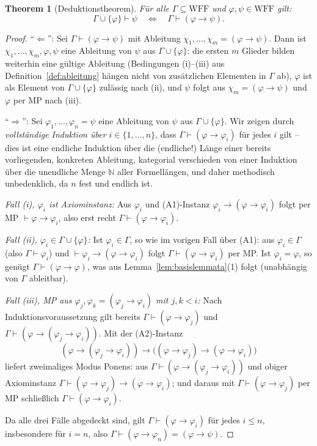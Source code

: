 \documentclass[12pt, a4paper]{article}
\newtheorem{theorem}{Theorem}[section]
\theoremstyle{definition}
\theoremstyle{remark}
\newcommand{\N}{\mathbb{N}}
\newcommand{\WFF}{\mathrm{WFF}}
\begin{document}
\begin{theorem}[Deduktionstheorem]
\label{thm:deduktionstheorem}
Für alle $\Gamma \subseteq \WFF$ und $\varphi,\psi \in \WFF$ gilt:
\[
  \Gamma \cup \{\varphi\} \vdash \psi \quad \Longleftrightarrow \quad \Gamma \vdash (\varphi \to \psi).
\]
\end{theorem}
\begin{proof}
``$\Leftarrow$'': Sei $\Gamma \vdash (\varphi\to\psi)$ mit Ableitung $\chi_1,\dots,\chi_m=(\varphi\to\psi)$. Dann ist $\chi_1,\dots,\chi_m,\varphi,\psi$ eine Ableitung von $\psi$ aus $\Gamma\cup\{\varphi\}$: die ersten $m$ Glieder bilden weiterhin eine gültige Ableitung (Bedingungen (i)--(iii) aus Definition~\ref{def:ableitung} hängen nicht von zusätzlichen Elementen in $\Gamma$ ab), $\varphi$ ist als Element von $\Gamma\cup\{\varphi\}$ zulässig nach (ii), und $\psi$ folgt aus $\chi_m = (\varphi\to\psi)$ und $\varphi$ per MP nach (iii).

``$\Rightarrow$'': Sei $\varphi_1,\dots,\varphi_n=\psi$ eine Ableitung von $\psi$ aus $\Gamma\cup\{\varphi\}$. Wir zeigen durch \emph{vollständige Induktion über $i \in \{1,\dots,n\}$}, dass $\Gamma \vdash (\varphi \to \varphi_i)$ für jedes $i$ gilt -- dies ist eine endliche Induktion über die (endliche!) Länge einer bereits vorliegenden, konkreten Ableitung, kategorial verschieden von einer Induktion über die unendliche Menge $\N$ aller Formellängen, und daher methodisch unbedenklich, da $n$ fest und endlich ist.

\emph{Fall (i), $\varphi_i$ ist Axiominstanz:} Aus $\varphi_i$ und (A1)-Instanz $\varphi_i \to (\varphi\to\varphi_i)$ folgt per MP $\vdash \varphi\to\varphi_i$, also erst recht $\Gamma\vdash(\varphi\to\varphi_i)$.

\emph{Fall (ii), $\varphi_i \in \Gamma\cup\{\varphi\}$:}
Ist $\varphi_i \in \Gamma$, so wie im vorigen Fall über (A1): aus $\varphi_i\in\Gamma$ (also $\Gamma\vdash\varphi_i$) und $\vdash \varphi_i\to(\varphi\to\varphi_i)$ folgt $\Gamma \vdash (\varphi\to\varphi_i)$ per MP.
Ist $\varphi_i = \varphi$, so genügt $\Gamma \vdash (\varphi\to\varphi)$, was aus Lemma~\ref{lem:basislemmata}(1) folgt (unabhängig von $\Gamma$ ableitbar).

\emph{Fall (iii), MP aus $\varphi_j,\varphi_k=(\varphi_j\to\varphi_i)$ mit $j,k<i$:} Nach Induktionsvoraussetzung gilt bereits $\Gamma \vdash (\varphi\to\varphi_j)$ und $\Gamma \vdash (\varphi\to(\varphi_j\to\varphi_i))$. Mit der (A2)-Instanz
\[
  (\varphi\to(\varphi_j\to\varphi_i)) \to \big((\varphi\to\varphi_j)\to(\varphi\to\varphi_i)\big)
\]
liefert zweimaliges Modus Ponens: aus $\Gamma\vdash(\varphi\to(\varphi_j\to\varphi_i))$ und obiger Axiominstanz $\Gamma \vdash (\varphi\to\varphi_j)\to(\varphi\to\varphi_i)$; und daraus mit $\Gamma\vdash(\varphi\to\varphi_j)$ per MP schließlich $\Gamma \vdash (\varphi\to\varphi_i)$.

Da alle drei Fälle abgedeckt sind, gilt $\Gamma\vdash(\varphi\to\varphi_i)$ für jedes $i\le n$, insbesondere für $i=n$, also $\Gamma \vdash (\varphi\to\varphi_n) = (\varphi\to\psi)$.
\end{proof}
\end{document}
